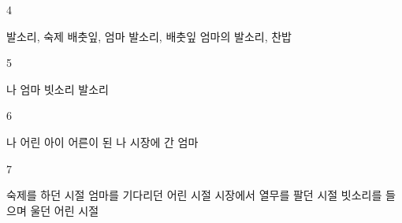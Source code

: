\documentclass[fs9,seriesRus]{korfarm-base}
\begin{document}
\begin{kfSentenceUnit}{4}{}
\begin{kfChoices}
\kfChoice 발소리, 숙제
\kfChoice 배춧잎, 엄마
\kfChoice 발소리, 배춧잎
\kfChoice 엄마의 발소리, 찬밥
\end{kfChoices}
\end{kfSentenceUnit}

\begin{kfSentenceUnit}{5}{}
\begin{kfChoices}
\kfChoice 나
\kfChoice 엄마
\kfChoice 빗소리
\kfChoice 발소리
\end{kfChoices}
\end{kfSentenceUnit}

\begin{kfSentenceUnit}{6}{}
\begin{kfChoices}
\kfChoice 나
\kfChoice 어린 아이
\kfChoice 어른이 된 나
\kfChoice 시장에 간 엄마
\end{kfChoices}
\end{kfSentenceUnit}

\begin{kfSentenceUnit}{7}{}
\begin{kfChoices}
\kfChoice 숙제를 하던 시절
\kfChoice 엄마를 기다리던 어린 시절
\kfChoice 시장에서 열무를 팔던 시절
\kfChoice 빗소리를 들으며 울던 어린 시절
\end{kfChoices}
\end{kfSentenceUnit}

\kfEndMC
\end{document}
